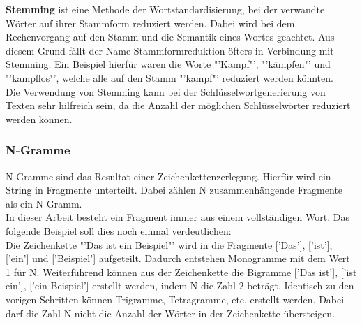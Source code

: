 			\textbf{Stemming} ist eine Methode der Wortstandardisierung, bei der verwandte Wörter auf ihrer Stammform reduziert werden. Dabei wird bei dem Rechenvorgang auf den Stamm und die Semantik eines Wortes geachtet. Aus diesem Grund fällt der Name Stammformreduktion öfters in Verbindung mit Stemming.\cite{eldesouki2009stemming} Ein Beispiel hierfür wären die Worte "'Kampf"', "'kämpfen"' und "'kampflos"', welche alle auf den Stamm "'kampf"' reduziert werden könnten.\\ 
			Die Verwendung von Stemming kann bei der Schlüsselwortgenerierung von Texten sehr hilfreich sein, da die Anzahl der möglichen Schlüsselwörter reduziert werden können.
		\subsubsection{N-Gramme}
		N-Gramme sind das Resultat einer Zeichenkettenzerlegung. Hierfür wird ein String in Fragmente unterteilt. Dabei zählen N zusammenhängende Fragmente als ein N-Gramm. \cite{cavnar1994n}\\
		In dieser Arbeit besteht ein Fragment immer aus einem vollständigen Wort. Das folgende Beispiel soll dies noch einmal verdeutlichen:\\
		Die Zeichenkette "'Das ist ein Beispiel"' wird in die Fragmente ['Das'], ['ist'], ['ein'] und ['Beispiel'] aufgeteilt. Dadurch entstehen Monogramme mit dem Wert 1 für N. Weiterführend können aus der Zeichenkette die Bigramme ['Das ist'], ['ist ein'], ['ein Beispiel'] erstellt werden, indem N die Zahl 2 beträgt. Identisch zu den vorigen Schritten können Trigramme, Tetragramme, etc. erstellt werden. Dabei darf die Zahl N nicht die Anzahl der Wörter in der Zeichenkette übersteigen.


